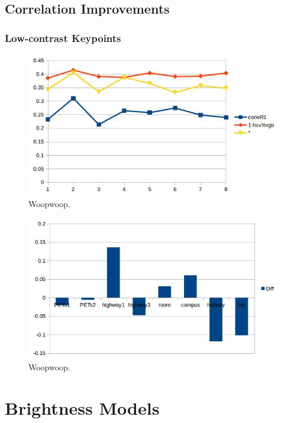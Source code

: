 \documentclass[12pt]{report}
\begin{document}
\subsection{Correlation Improvements}
\subsubsection{Low-contrast Keypoints}

\begin{figure}
  \includegraphics[width=1\linewidth]{figures/highway1_sift.jpg}
\caption{Woopwoop.}
\label{fig:highway1_sift}
\end{figure}

\begin{figure}
  \includegraphics[width=1\linewidth]{figures/sift_correlation_diff.jpg}
\caption{Woopwoop.}
\label{fig:highway1_sift}
\end{figure}

\section{Brightness Models}
\end{document}
